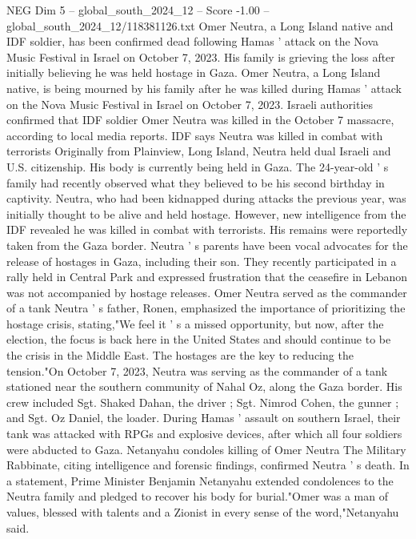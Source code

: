 \begin{textsample}{NEG Dim 5 – global\_south\_2024\_12 – Score -1.00 – global\_south\_2024\_12/118381126.txt}  \label{ex:f5_neg_404}
Omer Neutra, a Long Island native and IDF soldier, has been confirmed dead following Hamas ' attack on the Nova Music Festival in Israel on October 7, 2023.
His family is grieving the loss after initially believing he was held hostage in Gaza.
Omer Neutra, a Long Island native, is being mourned by his family after he was killed during Hamas ' attack on the Nova Music Festival in Israel on October 7, 2023.
Israeli authorities confirmed that IDF soldier Omer Neutra was killed in the October 7 massacre, according to local media reports.
IDF says Neutra was killed in combat with terrorists Originally from Plainview, Long Island, Neutra held dual Israeli and U.S. citizenship.
His body is currently being held in Gaza.
The 24-year-old ' s family had recently observed what they believed to be his second birthday in captivity.
Neutra, who had been kidnapped during attacks the previous year, was initially thought to be alive and held hostage.
However, new intelligence from the IDF revealed he was killed in combat with terrorists.
His remains were reportedly taken from the Gaza border.
Neutra ' s parents have been vocal advocates for the release of hostages in Gaza, including their son.
They recently participated in a rally held in Central Park and expressed frustration that the ceasefire in Lebanon was not accompanied by hostage releases.
Omer Neutra served as the commander of a tank Neutra ' s father, Ronen, emphasized the importance of prioritizing the hostage crisis, stating,"We feel it ' s a missed opportunity, but now, after the election, the focus is back here in the United States and should continue to be the crisis in the Middle East.
The hostages are the key to reducing the tension."On October 7, 2023, Neutra was serving as the commander of a tank stationed near the southern community of Nahal Oz, along the Gaza border.
His crew included Sgt.
Shaked Dahan, the driver ; Sgt.
Nimrod Cohen, the gunner ; and Sgt.
Oz Daniel, the loader.
During Hamas ' assault on southern Israel, their tank was attacked with RPGs and explosive devices, after which all four soldiers were abducted to Gaza.
Netanyahu condoles killing of Omer Neutra The Military Rabbinate, citing intelligence and forensic findings, confirmed Neutra ' s death.
In a statement, Prime Minister Benjamin Netanyahu extended condolences to the Neutra family and pledged to recover his body for burial."Omer was a man of values, blessed with talents and a Zionist in every sense of the word,"Netanyahu said.

\end{textsample}

